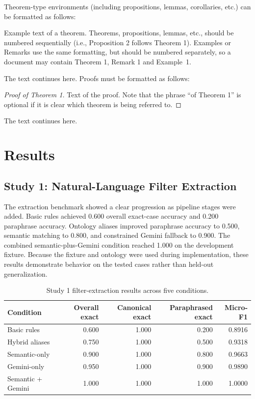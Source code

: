 \documentclass[journal,article,submit,moreauthors]{Definitions/mdpi}
\begin{document}
Theorem-type environments (including propositions, lemmas, corollaries, etc.) can be formatted as follows:
\begin{Theorem}
Example text of a theorem. Theorems, propositions, lemmas, etc., should be numbered sequentially (i.e., Proposition 2 follows Theorem 1). Examples or Remarks use the same formatting, but should be numbered separately, so a document may contain Theorem 1, Remark 1 and Example~1.
\end{Theorem}

The text continues here. Proofs must be formatted as follows:

\begin{proof}[Proof of Theorem 1]
Text of the proof. Note that the phrase ``of Theorem 1'' is optional if it is clear which theorem is being referred to.
\end{proof}
The text continues here.

\fi

\section{Results}

\subsection{Study 1: Natural-Language Filter Extraction}

The extraction benchmark showed a clear progression as pipeline stages were added. Basic rules achieved 0.600 overall exact-case accuracy and 0.200 paraphrase accuracy. Ontology aliases improved paraphrase accuracy to 0.500, semantic matching to 0.800, and constrained Gemini fallback to 0.900. The combined semantic-plus-Gemini condition reached 1.000 on the development fixture. Because the fixture and ontology were used during implementation, these results demonstrate behavior on the tested cases rather than held-out generalization.

\begin{table}[H]
\caption{Study 1 filter-extraction results across five conditions.}
\label{tab:journal_study1}
\small
\begin{tabularx}{\textwidth}{@{}Xrrrr@{}}
\toprule
\textbf{Condition} & \textbf{Overall exact} & \textbf{Canonical exact} & \textbf{Paraphrased exact} & \textbf{Micro-F1} \\
\midrule
Basic rules & 0.600 & 1.000 & 0.200 & 0.8916 \\
Hybrid aliases & 0.750 & 1.000 & 0.500 & 0.9318 \\
Semantic-only & 0.900 & 1.000 & 0.800 & 0.9663 \\
Gemini-only & 0.950 & 1.000 & 0.900 & 0.9890 \\
Semantic + Gemini & 1.000 & 1.000 & 1.000 & 1.0000 \\
\bottomrule
\end{tabularx}
\end{table}
\end{document}
